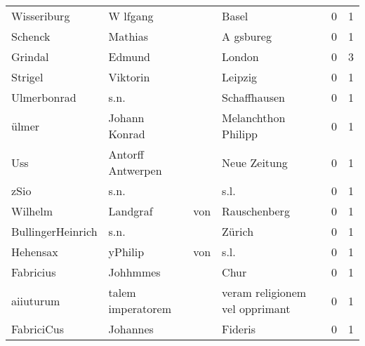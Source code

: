 \begin{center}
\begin{tiny}
\begin{longtabu}{llllrr}
              Wisseriburg &                           W lfgang &             &                                       Basel &          0 &         1 \\
                  Schenck &                            Mathias &             &                                   A gsbureg &          0 &         1 \\
                  Grindal &                             Edmund &             &                                      London &          0 &         3 \\
                  Strigel &                           Viktorin &             &                                     Leipzig &          0 &         1 \\
              Ulmerbonrad &                               s.n. &             &                                Schaffhausen &          0 &         1 \\
                    ülmer &                      Johann Konrad &             &                         Melanchthon Philipp &          0 &         1 \\
                      Uss &                  Antorff Antwerpen &             &                                Neue Zeitung &          0 &         1 \\
                     zSio &                               s.n. &             &                                        s.l. &          0 &         1 \\
                  Wilhelm &                           Landgraf &         von &                                Rauschenberg &          0 &         1 \\
        BullingerHeinrich &                               s.n. &             &                                      Zürich &          0 &         1 \\
                 Hehensax &                            yPhilip &         von &                                        s.l. &          0 &         1 \\
                Fabricius &                           Johhmmes &             &                                        Chur &          0 &         1 \\
                aiiuturum &                  talem imperatorem &             &              veram religionem vel opprimant &          0 &         1 \\
               FabriciCus &                           Johannes &             &                                     Fideris &          0 &         1 \\

\end{longtabu}
\end{tiny}
\end{center}
